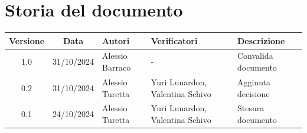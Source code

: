 \section{Storia del documento}
\begin{center}

\begin{tabularx}{\textwidth}{ c c p{2.75cm} p{2.75cm} X }
    \rowcolor{gray!20}\rule{0pt}{0.5cm}\textbf{Versione} & \textbf{Data} & \textbf{Autori} & \textbf{Verificatori} & \textbf{Descrizione} \\[0.7ex]
    \hline
    \rule{0pt}{0.5cm}1.0 & 31/10/2024 & Alessio Barraco & - & Convalida documento \\[0.7ex]
    \hline
    \rule{0pt}{0.5cm}0.2 & 31/10/2024 & Alessio Turetta & Yuri Lunardon, \newline Valentina Schivo & Aggiunta decisione \\[3.5ex]
    \hline
    \rule{0pt}{0.5cm}0.1 & 24/10/2024 & Alessio Turetta & Yuri Lunardon, \newline Valentina Schivo & Stesura documento \\[0.7ex]
\end{tabularx}

\end{center}


